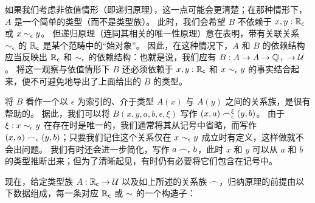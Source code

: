 如果我们考虑非依值情形（即递归原理），这一点可能会更清楚；在那种情形下，$A$ 是一个简单的类型（而不是类型族）。
此时，我们会希望 $B$ 不依赖于 $x,y:\mathbb{R}_\mathsf{c}$ 或 $x\sim_{\epsilon} y$。
但递归原理（连同其相关的唯一性原理）意在表明，带有关联关系 $\sim_{\epsilon}$ 的 $\mathbb{R}_\mathsf{c}$ 是某个范畴中的``始对象''。
因此，在这种情况下，$A$ 和 $B$ 的依赖结构应当反映出 $\mathbb{R}_\mathsf{c}$ 和 $\sim_{\epsilon}$ 的依赖结构：也就是说，我们应有 $B:A\to A\to \mathbb{Q}_{+} \to \mathcal{U}$。
将这一观察与依值情形下 $B$ 还必须依赖于 $x,y:\mathbb{R}_\mathsf{c}$ 和 $x\sim_{\epsilon} y$ 的事实结合起来，便不可避免地导出了上面给出的 $B$ 的类型。

将 $B$ 看作一个以 $\epsilon$ 为索引的、介于类型 $A(x)$ 与 $A(y)$ 之间的关系族，是很有帮助的。
据此，我们可以将 $B(x,y,a,b,\epsilon,\xi)$ 写作 $(x,a) \frown_\epsilon^\xi (y,b)$。
由于 $\xi:x\sim_{\epsilon} y$ 在存在时是唯一的，我们通常将其从记号中省略，而写作 $(x,a) \frown_\epsilon (y,b)$；只要我们记住这个关系仅在 $x\sim_{\epsilon} y$ 成立时有定义，这样做就不会出问题。
我们有时还会进一步简化，写作 $a\frown_\epsilon b$，此时 $x$ 和 $y$ 可以从 $a$ 和 $b$ 的类型推断出来；但为了清晰起见，有时仍有必要将它们包含在记号中。

%
现在，给定类型族 $A:\mathbb{R}_\mathsf{c}\to\mathcal{U}$ 以及如上所述的关系族 $\frown$，归纳原理的前提由以下数据组成，每一条对应 $\mathbb{R}_\mathsf{c}$ 或 $\mathord\sim$ 的一个构造子：


